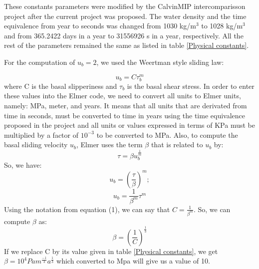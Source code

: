 \documentclass{article}
\begin{document}
These constants parameters were modified by the CalvinMIP intercomparisson project after the current project was proposed. The water density and the time equivalence from year to seconds was changed from 1030 kg/m$^3$ to 1028 kg/m$^3$ and from 365.2422 days in a year to 31556926 s in a year, respectively. All the rest of the parameters remained the same as listed in table \ref{Physical constants}.

For the computation of $u_b=2$, we used the Weertman style sliding law:

\begin{equation}
	u_b = C\tau _b^m
\end{equation}
where C is the basal slipperiness and $\tau _b$ is the basal shear stress.
In order to enter these values into the Elmer code, we need to convert all units to Elmer units, namely: MPa, meter, and years. It means that all units that are derivated from time in seconds, must be converted to time in years using the time equivalence proposed in the project and all units or values expressed in terms of KPa must be multiplied by a factor of $10^{-3}$ to be converted to MPa.
Also, to compute the basal sliding velocity $u_b$, Elmer uses the term $\beta$ that is related to $u_b$ by:
\begin{equation}
	\tau = \beta u_b^{\frac{1}{m}}
\end{equation}
So, we have:
\begin{equation}
	u_b = (\frac{\tau}{\beta})^m;
\end{equation}
\begin{equation}
	u_b = \frac{1}{\beta^m} \tau^m
\end{equation}
Using the notation from equation (1), we can say that $C=  \frac{1}{\beta^m}$. So, we can compute $\beta$ as:
\begin{equation}
	\beta=(\frac{1}{C})^{\frac{1}{3}}
\end{equation}
If we replace C by its value given in table \ref{Physical constants}, we get $\beta= 10^4 Pa m^{\frac{-1}{3}} a^{\frac{1}{3}}$ which converted to Mpa will give us a value of 10.
\end{document}
